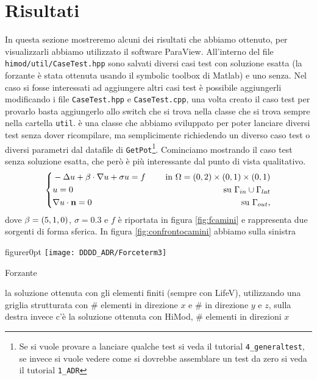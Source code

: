 \chapter{Risultati}
In questa sezione mostreremo alcuni dei risultati che abbiamo ottenuto, per visualizzarli abbiamo utilizzato
il software ParaView.
All'interno del file \texttt{himod/util/CaseTest.hpp} sono salvati diversi casi test
con soluzione esatta (la forzante \`e stata ottenuta usando il symbolic toolbox di Matlab) e uno senza.
Nel caso si fosse interessati ad aggiungere altri casi test \`e possibile aggiungerli modificando i
file \texttt{CaseTest.hpp} e \texttt{CaseTest.cpp}, una volta creato il caso test 
per provarlo basta aggiungerlo allo switch che si trova nella classe  che si trova sempre nella
cartella \texttt{util}.  \`e una classe che abbiamo sviluppato per poter
lanciare diversi test senza dover ricompilare, ma semplicimente richiedendo un diverso caso test o diversi 
parametri dal datafile di \texttt{GetPot}\footnote{Se si vuole provare a lanciare qualche test si veda il tutorial
\texttt{4\_generaltest}, se invece si vuole vedere come si dovrebbe assemblare un test da zero si veda il tutorial \texttt{1\_ADR} }.
Cominciamo mostrando il caso test senza soluzione esatta, che per\`o \`e pi\`u interessante dal punto di vista qualitativo.
\begin{equation}
 \label{eq:camini}
 \left\{
\begin{aligned}
 &-\Delta u + \mathbf{\beta}\cdot\nabla u + \sigma u = f &\quad \text{ in }\Omega=(0,2)\times(0,1)\times(0,1)\\
 &u=0 &\quad \text{ su } \Gamma_{in} \cup \Gamma_{lat}\\
 &\nabla u\cdot \mathbf{n} = 0 &\quad \text{ su } \Gamma_{out},
\end{aligned}
\right.
\end{equation}
dove $\mathbf{\beta}=(5,1,0)$, $\sigma=0.3$ e $f$ \`e riportata in figura \ref{fig:fcamini} e rappresenta due sorgenti 
di forma sferica.
In figura \ref{fig:confrontocamini} abbiamo sulla sinistra\begin{wrapfloat}{figure}{r}{0pt}
\texttt{[image: DDDD\_ADR/Forceterm3]}
 \caption{Forzante}
 \label{fig:fcamini}
\end{wrapfloat} la soluzione ottenuta con
gli elementi finiti (sempre con LifeV), utilizzando una griglia strutturata con \# elementi in direzione $x$
e \# in direzione $y$ e $z$, sulla destra invece c'\`e la soluzione ottenuta con HiMod, \# elementi in direzioni $x$
